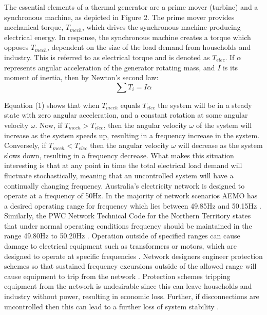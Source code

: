 \documentclass[12pt, a4paper]{article}
\begin{document}
The essential elements of a thermal generator are a prime mover (turbine) and a synchronous machine, as depicted in Figure 2. The prime mover provides mechanical torque, $T_{mech}$, which drives the synchronous machine producing electrical energy. In response, the synchronous machine creates a torque which opposes $T_{mech}$, dependent on the size of the load demand from households and industry. This is referred to as electrical torque and is denoted as $T_{elec}$. If $\alpha$ represents angular acceleration of the generator rotating mass, and $I$ is its moment of inertia, then by Newton's second law:
\begin{equation}
\sum T_i = I \alpha 
\end{equation}

Equation (1) shows that when $T_{mech}$ equals $T_{elec}$ the system will be in a steady state with zero angular acceleration, and a constant rotation at some angular velocity $\omega$. Now, if $T_{mech} > T_{elec}$, then the angular velocity $\omega$ of the system will increase as the system speeds up, resulting in a frequency increase in the system. Conversely, if $T_{mech} < T_{elec}$ then the angular velocity $\omega$ will decrease as the system slows down, resulting in a frequency decrease. What makes this situation interesting is that at any point in time the total electrical load demand will fluctuate stochastically, meaning that an uncontrolled system will have a continually changing frequency. Australia's electricity network is designed to operate at a frequency of 50$\si{\hertz}$. In the majority of network scenarios AEMO has a desired operating range for frequency which lies between 49.85$\si{\hertz}$ and 50.15$\si{\hertz}$ \cite{AEMO2012}. Similarly, the PWC Network Technical Code for the Northern Territory states that under normal operating conditions frequency should be maintained in the range 49.80$\si{\hertz}$ to 50.20$\si{\hertz}$ \cite{PWC2018}. Operation outside of specified ranges can cause damage to electrical equipment such as transformers or motors, which are designed to operate at specific frequencies \cite{Sen2014}. Network designers engineer protection schemes so that sustained frequency excursions outside of the allowed range will cause equipment to trip from the network \cite{AEMO201804}. Protection schemes tripping equipment from the network is undesirable since this can leave households and industry without power, resulting in economic loss. Further, if disconnections are uncontrolled then this can lead to a further loss of system stability \cite{AEMO201804}.
\end{document}
